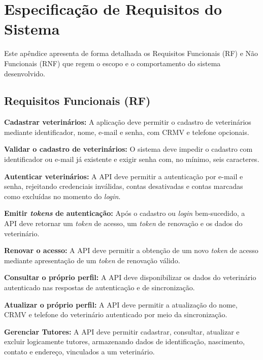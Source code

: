 \chapter{Especificação de Requisitos do Sistema}
\label{ap:requisitos}

Este apêndice apresenta de forma detalhada os Requisitos Funcionais (RF) e Não Funcionais (RNF) que regem o escopo e o comportamento do sistema desenvolvido.

\section{Requisitos Funcionais (RF)}
\label{sec:ap_rf}

\begin{description}[leftmargin=1.8cm, labelwidth=1.5cm, itemsep=0.5em]
    \item[RF01] \textbf{Cadastrar veterinários:} A aplicação deve permitir o cadastro de veterinários mediante identificador, nome, e-mail e senha, com CRMV e telefone opcionais.
    \item[RF02] \textbf{Validar o cadastro de veterinários:} O sistema deve impedir o cadastro com identificador ou e-mail já existente e exigir senha com, no mínimo, seis caracteres.
    \item[RF03] \textbf{Autenticar veterinários:} A API deve permitir a autenticação por e-mail e senha, rejeitando credenciais inválidas, contas desativadas e contas marcadas como excluídas no momento do \textit{login}.
    \item[RF04] \textbf{Emitir \textit{tokens} de autenticação:} Após o cadastro ou \textit{login} bem-sucedido, a API deve retornar um \textit{token} de acesso, um \textit{token} de renovação e os dados do veterinário.
    \item[RF05] \textbf{Renovar o acesso:} A API deve permitir a obtenção de um novo \textit{token} de acesso mediante apresentação de um \textit{token} de renovação válido.
    \item[RF06] \textbf{Consultar o próprio perfil:} A API deve disponibilizar os dados do veterinário autenticado nas respostas de autenticação e de sincronização.
    \item[RF07] \textbf{Atualizar o próprio perfil:} A API deve permitir a atualização do nome, CRMV e telefone do veterinário autenticado por meio da sincronização.
    \item[RF08] \textbf{Gerenciar Tutores:} A API deve permitir cadastrar, consultar, atualizar e excluir logicamente tutores, armazenando dados de identificação, nascimento, contato e endereço, vinculados a um veterinário.

\end{description}
